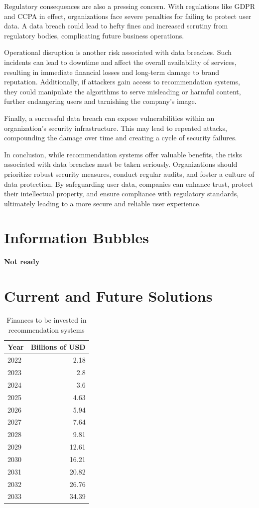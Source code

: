 \documentclass[10pt,twoside,slovak,a4paper]{article}
\begin{document}
\newpage
Regulatory consequences are also a pressing concern. With regulations like GDPR and CCPA in effect, organizations face severe penalties for failing to protect user data. A data breach could lead to hefty fines and increased scrutiny from regulatory bodies, complicating future business operations.

Operational disruption is another risk associated with data breaches\cite{info}. Such incidents can lead to downtime and affect the overall availability of services, resulting in immediate financial losses and long-term damage to brand reputation. Additionally, if attackers gain access to recommendation systems, they could manipulate the algorithms to serve misleading or harmful content, further endangering users and tarnishing the company’s image.

Finally, a successful data breach can expose vulnerabilities within an organization’s security infrastructure\cite{data}. This may lead to repeated attacks, compounding the damage over time and creating a cycle of security failures.

In conclusion, while recommendation systems offer valuable benefits, the risks associated with data breaches must be taken seriously. Organizations should prioritize robust security measures, conduct regular audits, and foster a culture of data protection. By safeguarding user data, companies can enhance trust, protect their intellectual property, and ensure compliance with regulatory standards, ultimately leading to a more secure and reliable user experience.

\section{Information Bubbles} \label{Information Bubbles}
\textbf{Not ready}
 

\section{Current and Future Solutions} \label{Current and Future Solutions}

\begin{table}[ht]
\centering
    \begin{tabular}{l|r}
        Year  & Billions of USD \\\hline
        2022  & 2.18  \\
        2023  & 2.8   \\
        2024  & 3.6    \\
        2025  & 4.63   \\
        2026  & 5.94   \\
        2027  & 7.64   \\
        2028  & 9.81   \\
        2029  & 12.61  \\
        2030  & 16.21  \\
        2031  & 20.82  \\
        2032  & 26.76  \\
        2033  & 34.39  \\
    \end{tabular}
    \caption{Finances to be invested in recommendation systems}
    \label{tab:widgets}
\end{table}
\end{document}
